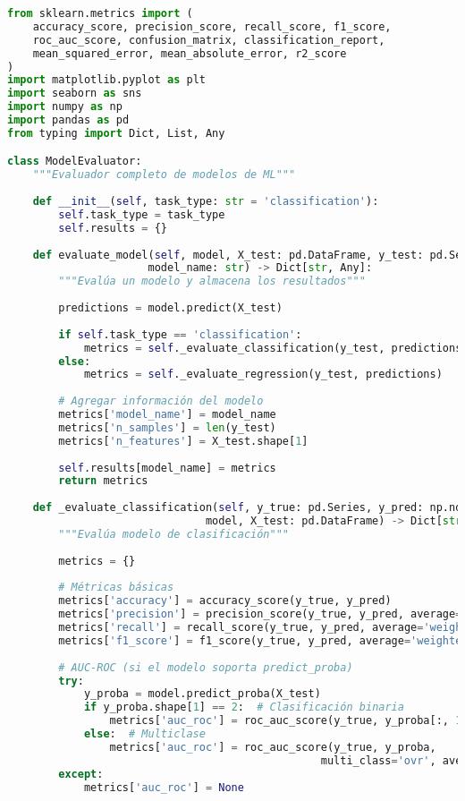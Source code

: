 \begin{lstlisting}[language=Python, caption=Sistema completo de evaluación]
from sklearn.metrics import (
    accuracy_score, precision_score, recall_score, f1_score,
    roc_auc_score, confusion_matrix, classification_report,
    mean_squared_error, mean_absolute_error, r2_score
)
import matplotlib.pyplot as plt
import seaborn as sns
import numpy as np
import pandas as pd
from typing import Dict, List, Any

class ModelEvaluator:
    """Evaluador completo de modelos de ML"""
    
    def __init__(self, task_type: str = 'classification'):
        self.task_type = task_type
        self.results = {}
    
    def evaluate_model(self, model, X_test: pd.DataFrame, y_test: pd.Series, 
                      model_name: str) -> Dict[str, Any]:
        """Evalúa un modelo y almacena los resultados"""
        
        predictions = model.predict(X_test)
        
        if self.task_type == 'classification':
            metrics = self._evaluate_classification(y_test, predictions, model, X_test)
        else:
            metrics = self._evaluate_regression(y_test, predictions)
        
        # Agregar información del modelo
        metrics['model_name'] = model_name
        metrics['n_samples'] = len(y_test)
        metrics['n_features'] = X_test.shape[1]
        
        self.results[model_name] = metrics
        return metrics
    
    def _evaluate_classification(self, y_true: pd.Series, y_pred: np.ndarray, 
                               model, X_test: pd.DataFrame) -> Dict[str, Any]:
        """Evalúa modelo de clasificación"""
        
        metrics = {}
        
        # Métricas básicas
        metrics['accuracy'] = accuracy_score(y_true, y_pred)
        metrics['precision'] = precision_score(y_true, y_pred, average='weighted')
        metrics['recall'] = recall_score(y_true, y_pred, average='weighted')
        metrics['f1_score'] = f1_score(y_true, y_pred, average='weighted')
        
        # AUC-ROC (si el modelo soporta predict_proba)
        try:
            y_proba = model.predict_proba(X_test)
            if y_proba.shape[1] == 2:  # Clasificación binaria
                metrics['auc_roc'] = roc_auc_score(y_true, y_proba[:, 1])
            else:  # Multiclase
                metrics['auc_roc'] = roc_auc_score(y_true, y_proba, 
                                                 multi_class='ovr', average='weighted')
        except:
            metrics['auc_roc'] = None
        

\end{lstlisting}
